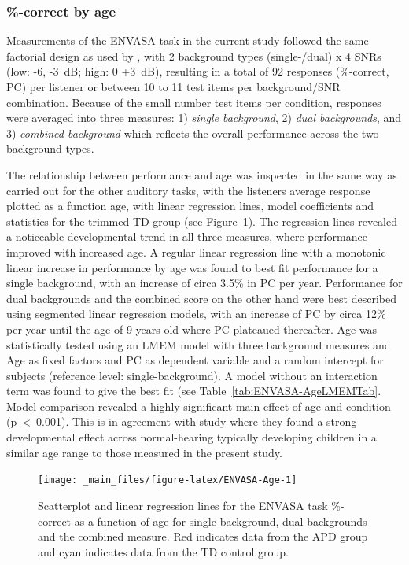 \documentclass[a4paper, twoside]{templates/ociamthesis}
\begin{document}
\hypertarget{correct-by-age}{%
\subsubsection*{\%-correct by age}\label{correct-by-age}}

Measurements of the ENVASA task in the current study followed the same factorial design as used by \textcite{Leech2009}, with 2 background types (single-/dual) x 4 SNRs (low: -6, -3~dB; high: 0 +3~dB), resulting in a total of 92 responses (\%-correct, PC) per listener or between 10 to 11 test items per background/SNR combination. Because of the small number test items per condition, responses were averaged into three measures: 1) \emph{single background}, 2) \emph{dual backgrounds}, and 3) \emph{combined background} which reflects the overall performance across the two background types.

The relationship between performance and age was inspected in the same way as carried out for the other auditory tasks, with the listeners average response plotted as a function age, with linear regression lines, model coefficients and statistics for the trimmed TD group (see Figure~\ref{fig:ENVASA-Age}). The regression lines revealed a noticeable developmental trend in all three measures, where performance improved with increased age. A regular linear regression line with a monotonic linear increase in performance by age was found to best fit performance for a single background, with an increase of circa 3.5\% in PC per year. Performance for dual backgrounds and the combined score on the other hand were best described using segmented linear regression models, with an increase of PC by circa 12\% per year until the age of 9 years old where PC plateaued thereafter. Age was statistically tested using an LMEM model with three background measures and Age as fixed factors and PC as dependent variable and a random intercept for subjects (reference level: single-background). A model without an interaction term was found to give the best fit (see Table~\ref{tab:ENVASA-AgeLMEMTab}. Model comparison revealed a highly significant main effect of age and condition (p~\textless~0.001). This is in agreement with \textcite{Krishnan2013} study where they found a strong developmental effect across normal-hearing typically developing children in a similar age range to those measured in the present study.

\begin{figure}

{\centering \texttt{[image: \_main\_files/figure-latex/ENVASA-Age-1]} 

}

\caption{Scatterplot and linear regression lines for the ENVASA task \%-correct as a function of age for single background, dual backgrounds and the combined measure. Red indicates data from the APD group and cyan indicates data from the TD control group.}\label{fig:ENVASA-Age}
\end{figure}
\end{document}
